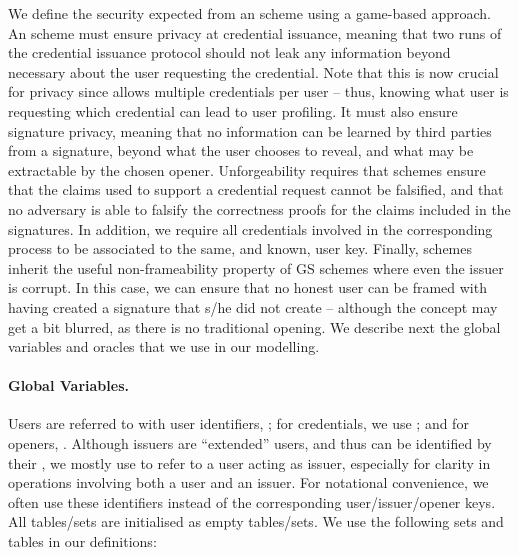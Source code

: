 We define the security expected from an \UAS scheme using a game-based approach.
An \UAS scheme must ensure privacy at credential issuance, meaning that two
runs of the credential issuance protocol should not leak any information beyond
necessary about the user requesting the credential. Note that this is now
crucial for privacy since \UAS allows multiple credentials per
user -- thus, knowing what user is requesting which credential can lead to user
profiling. It must also ensure signature privacy, meaning that no information
can be learned by third parties from a signature, beyond what the user chooses
to reveal, and what may be extractable by the chosen opener. Unforgeability
requires that \UAS schemes ensure that the claims used to support a credential
request cannot be falsified, and that no adversary is able to falsify the
correctness proofs for the claims included in the signatures. In addition, we
require all credentials involved in the corresponding process to be associated
to the same, and known, user key. Finally, \UAS schemes inherit the useful
non-frameability property of GS schemes where even the issuer is corrupt. In
this case, we can ensure that no honest user can be framed with having created a
signature that s/he did not create -- although the concept may get a bit
blurred, as there is no traditional opening.
%
We describe next the global variables and oracles that we use in our modelling.

\paragraph{Global Variables.} %
Users are referred to with user identifiers, \uid; for credentials, we use \cid;
and for openers, \oid. Although issuers are ``extended'' users, and thus can be
identified by their \uid, we mostly use \iid to refer to a user acting as
issuer, especially for clarity in operations involving both a user and an
issuer.
%
For notational convenience, we often use these identifiers instead of the
corresponding user/issuer/opener keys.
%
All tables/sets are initialised as empty tables/sets. We use the following sets
and tables in our definitions:

